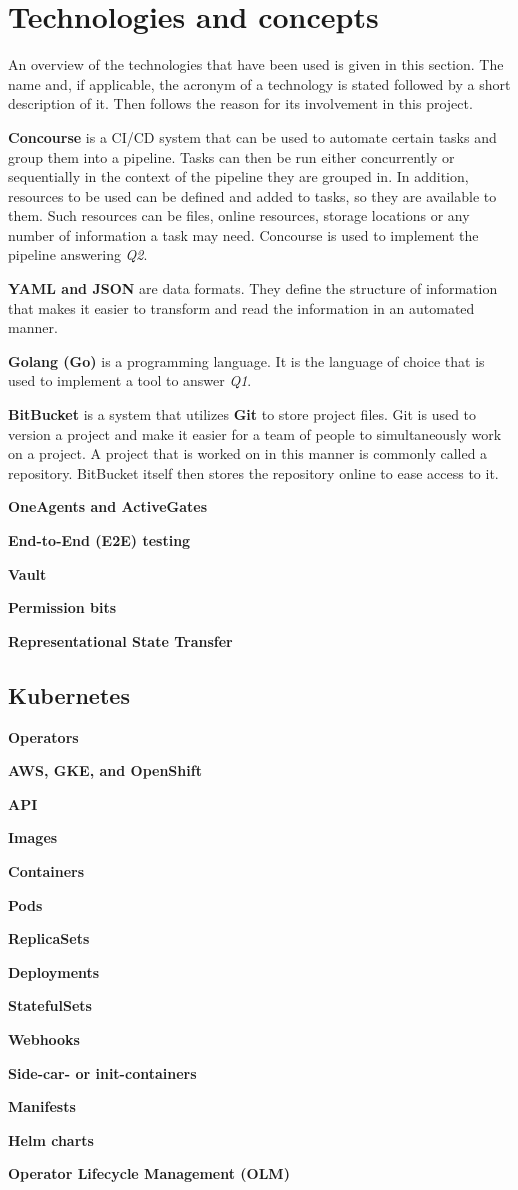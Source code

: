 \chapter{Technologies and concepts}\label{ch:technologies-used}

An overview of the technologies that have been used is given in this section.
The name and, if applicable, the acronym of a technology is stated followed by a short description of it.
Then follows the reason for its involvement in this project.

\textbf{Concourse} is a CI/CD system that can be used to automate certain tasks and group them into a pipeline.
Tasks can then be run either concurrently or sequentially in the context of the pipeline they are grouped in.
In addition, resources to be used can be defined and added to tasks, so they are available to them.
Such resources can be files, online resources, storage locations or any number of information a task may need.
Concourse is used to implement the pipeline answering \textit{Q2}.

\textbf{YAML and JSON} are data formats.
They define the structure of information that makes it easier to transform and read the information in an automated manner.

\textbf{Golang (Go)} is a programming language.
It is the language of choice that is used to implement a tool to answer \textit{Q1}.

\textbf{BitBucket} is a system that utilizes \textbf{Git} to store project files.
Git is used to version a project and make it easier for a team of people to simultaneously work on a project.
A project that is worked on in this manner is commonly called a repository.
BitBucket itself then stores the repository online to ease access to it.

\textbf{OneAgents and ActiveGates}

\textbf{End-to-End (E2E) testing}

\textbf{Vault}

\textbf{Permission bits}

\textbf{Representational State Transfer}

\section{Kubernetes}\label{sec:kubernetes}

\textbf{Operators}

\textbf{AWS, GKE, and OpenShift}

\textbf{API}

\textbf{Images}

\textbf{Containers}

\textbf{Pods}

\textbf{ReplicaSets}

\textbf{Deployments}

\textbf{StatefulSets}

\textbf{Webhooks}

\textbf{Side-car- or init-containers}

\textbf{Manifests}

\textbf{Helm charts}

\textbf{Operator Lifecycle Management (OLM)}